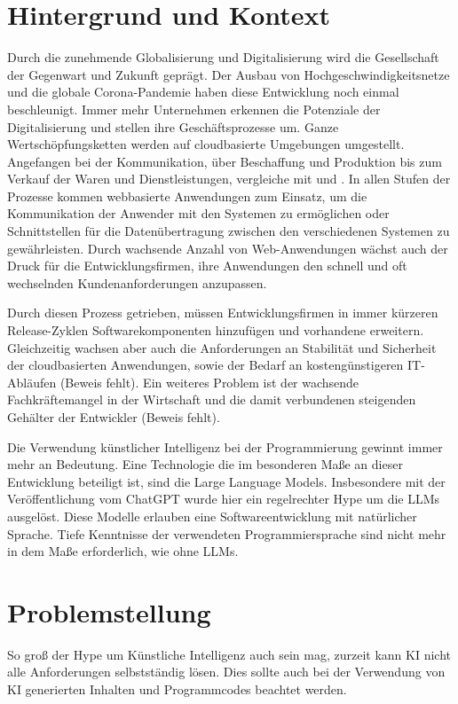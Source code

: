 \section{Hintergrund und Kontext}
Durch die zunehmende Globalisierung und Digitalisierung wird die Gesellschaft der Gegenwart und Zukunft geprägt. Der Ausbau von Hochgeschwindigkeitsnetze und die globale Corona-Pandemie haben diese Entwicklung noch einmal beschleunigt. Immer mehr Unternehmen erkennen die Potenziale der Digitalisierung und stellen ihre Geschäftsprozesse um. Ganze Wertschöpfungsketten werden auf cloudbasierte Umgebungen umgestellt. Angefangen bei der Kommunikation, über Beschaffung und Produktion bis zum Verkauf der Waren und Dienstleistungen, vergleiche mit \parencite[Seite 21 ff.]{banholzer-2020} und \cite{oswald-2022}. In allen Stufen der Prozesse kommen webbasierte Anwendungen zum Einsatz, um die Kommunikation der Anwender mit den Systemen zu ermöglichen oder Schnittstellen für die Datenübertragung zwischen den verschiedenen Systemen zu gewährleisten. Durch wachsende Anzahl von Web-Anwendungen wächst auch der Druck für die Entwicklungsfirmen, ihre Anwendungen den schnell und oft wechselnden Kundenanforderungen anzupassen.\vspace{0.2cm}

Durch diesen Prozess getrieben, müssen Entwicklungsfirmen in immer kürzeren Release-Zyklen Softwarekomponenten hinzufügen und vorhandene erweitern. Gleichzeitig wachsen aber auch die Anforderungen an Stabilität und Sicherheit der cloudbasierten Anwendungen, sowie der Bedarf an kostengünstigeren IT-Abläufen (Beweis fehlt). Ein weiteres Problem ist der wachsende Fachkräftemangel in der Wirtschaft und die damit verbundenen steigenden Gehälter der Entwickler (Beweis fehlt).\vspace{0.2cm}

Die Verwendung künstlicher Intelligenz bei der Programmierung gewinnt immer mehr an Bedeutung. Eine Technologie die im besonderen Maße an dieser Entwicklung beteiligt ist, sind die Large Language Models. Insbesondere mit der Veröffentlichung vom ChatGPT wurde hier ein regelrechter Hype um die \acrshort{LLM}s ausgelöst. Diese Modelle erlauben eine Softwareentwicklung mit natürlicher Sprache. Tiefe Kenntnisse der verwendeten Programmiersprache sind nicht mehr in dem Maße erforderlich, wie ohne LLMs.\vspace{0.2cm}


\section{Problemstellung}
So groß der Hype um Künstliche Intelligenz auch sein mag, zurzeit kann KI nicht alle Anforderungen selbstständig lösen. Dies sollte auch bei der Verwendung von KI generierten Inhalten und Programmcodes beachtet werden.

